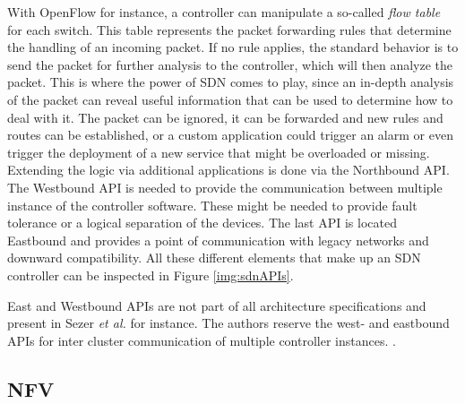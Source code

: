With OpenFlow for instance, a controller can manipulate a so-called \textit{flow table } for each switch. This table represents the packet forwarding rules that determine the handling of an incoming packet. If no rule applies, the standard behavior is to send the packet for further analysis to the controller, which will then analyze the packet. This is where the power of SDN comes to play, since an in-depth analysis of the packet can reveal useful information that can be used to determine how to deal with it. The packet can be ignored, it can be forwarded and new rules and routes can be established, or a custom application could trigger an alarm or even trigger the deployment of a new service that might be overloaded or missing. Extending the logic via additional applications is done via the Northbound API. The Westbound API is needed to provide the communication between multiple instance of the controller software. These might be needed to provide fault tolerance or a logical separation of the devices. The last API is located Eastbound and provides a point of communication with legacy networks and downward compatibility. All these different elements that make up an SDN controller can be inspected in Figure \ref{img:sdnAPIs}.

East and Westbound APIs are not part of all architecture specifications and present in Sezer \textit{et al.} \cite{sezer2013we} for instance. The authors reserve the west- and eastbound APIs for inter cluster communication of multiple controller instances. \cite{hu2014survey} \cite{jarschel2014interfaces} \cite{nunes2014survey} \cite{sezer2013we} \cite{shin2012software} \cite{jammal2014software}.

\subsection{NFV}

